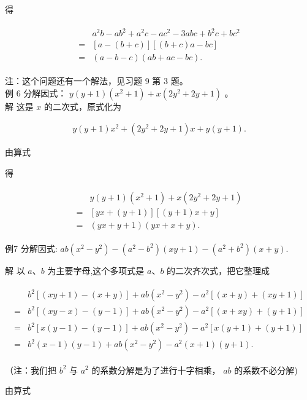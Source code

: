 \documentclass[10pt]{article}
\begin{document}
得

\begin{align*}
\begin{aligned}
& a^{2} b-a b^{2}+a^{2} c-a c^{2}-3 a b c+b^{2} c+b c^{2} \\
= & {[a-(b+c)][(b+c) a-b c] } \\
= & (a-b-c)(a b+a c-b c) .
\end{aligned}
\end{align*}

注：这个问题还有一个解法，见习题 9 第 3 题。\\
例 6 分解因式： $y(y+1)\left(x^{2}+1\right)+x\left(2 y^{2}+2 y+1\right)$ 。\\
解 这是 $x$ 的二次式，原式化为

\begin{align*}
y(y+1) x^{2}+\left(2 y^{2}+2 y+1\right) x+y(y+1) .
\end{align*}

由算式

得

\begin{align*}
\begin{aligned}
& y(y+1)\left(x^{2}+1\right)+x\left(2 y^{2}+2 y+1\right) \\
= & {[y x+(y+1)][(y+1) x+y] } \\
= & (y x+y+1)(y x+x+y) .
\end{aligned}
\end{align*}

例7 分解因式: $a b\left(x^{2}-y^{2}\right)-\left(a^{2}-b^{2}\right)(x y+1)-\left(a^{2}+b^{2}\right)(x+y)$.

解 以 $a 、 b$ 为主要字母,这个多项式是 $a 、 b$ 的二次齐次式，把它整理成

\begin{align*}
\begin{aligned}
& b^{2}[(x y+1)-(x+y)]+a b\left(x^{2}-y^{2}\right)-a^{2}[(x+y)+(x y+1)] \\
= & b^{2}[(x y-x)-(y-1)]+a b\left(x^{2}-y^{2}\right)-a^{2}[(x+x y)+(y+1)] \\
= & b^{2}[x(y-1)-(y-1)]+a b\left(x^{2}-y^{2}\right)-a^{2}[x(y+1)+(y+1)] \\
= & b^{2}(x-1)(y-1)+a b\left(x^{2}-y^{2}\right)-a^{2}(x+1)(y+1) .
\end{aligned}
\end{align*}

（注：我们把 $b^{2}$ 与 $a^{2}$ 的系数分解是为了进行十字相乘， $a b$ 的系数不必分解)

由算式
\end{document}
